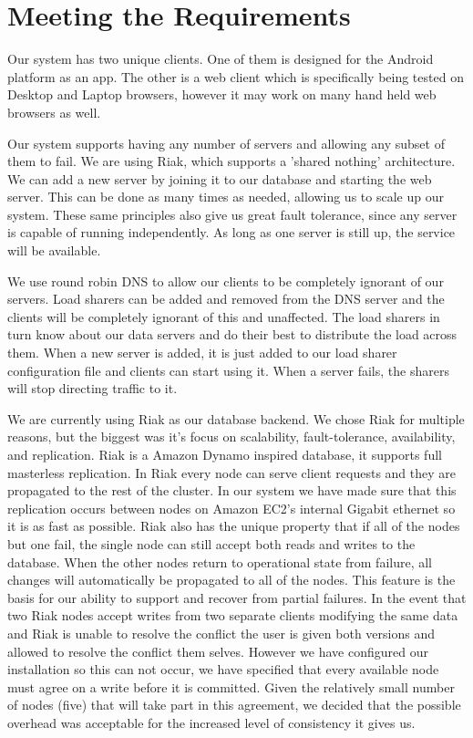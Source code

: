 \documentclass{dependencies/acm_proc_article-sp}
\begin{document}
\section {Meeting the Requirements}

Our system has two unique clients. One of them is designed for the Android platform as an app.
The other is a web client which is specifically being tested on Desktop and Laptop
browsers, however it may work on many hand held web browsers as well.

Our system supports having any number of servers and allowing any subset of them to fail.
We are using Riak, which supports a 'shared nothing' architecture.  We can add a new server
by joining it to our database and starting the web server.  This can be done as many times
as needed, allowing us to scale up our system.  These same principles also give us great fault
tolerance, since any server is capable of running independently.  As long as one server is still
up, the service will be available.

We use round robin DNS to allow our clients to be completely ignorant of our servers.  Load sharers
can be added and removed from the DNS server and the clients will be completely ignorant of this
and unaffected.  The load sharers in turn know about our data servers and do their best to
distribute the load across them.  When a new server is added, it is just added to our load sharer
configuration file and clients can start using it.  When a server fails, the sharers will stop directing
traffic to it.


We are currently using Riak as our database backend. We chose Riak for multiple
reasons, but the biggest was it's focus on  scalability, fault-tolerance,
availability, and replication. Riak is a Amazon Dynamo \cite{dynamo} inspired
database, it supports full masterless replication. In Riak every node can
serve client requests and they are propagated to the rest of the cluster.
In our system we have made sure that this replication occurs between nodes
on Amazon EC2's internal Gigabit ethernet so it is as fast as possible. Riak
also has the unique property that if all of the nodes but one fail, the single
node can still accept both reads and writes to the database. When the other
nodes return to operational state from failure, all changes will automatically
be propagated to all of the nodes. This feature is the basis for our ability to
support and recover from partial failures. In the event that two Riak nodes accept
writes from two separate clients modifying the same data and Riak is unable
to resolve the conflict the user is given both versions and allowed to resolve
the conflict them selves. However we have configured our installation so this
can not occur, we have specified that every available node must agree on a
write before it is committed. Given the relatively small number of nodes (five)
that will take part in this agreement, we decided that the possible overhead
was acceptable for the increased level of consistency it gives us.
\end{document}
